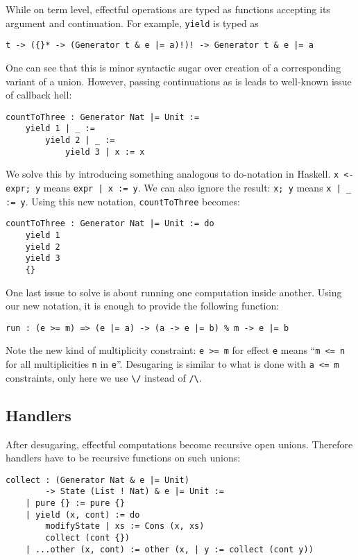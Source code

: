 \documentclass[a4paper,14pt]{extreport}
\begin{document}
While on term level, effectful operations are typed as functions accepting its
argument and continuation. For example, \verb|yield| is typed as

\begin{verbatim}
t -> ({}* -> (Generator t & e |= a)!)! -> Generator t & e |= a
\end{verbatim}

One can see that this is minor syntactic sugar over creation of a corresponding
variant of a union. However, passing continuations as is leads to well-known
issue of callback hell:

\begin{verbatim}
countToThree : Generator Nat |= Unit :=
    yield 1 | _ :=
        yield 2 | _ :=
            yield 3 | x := x
\end{verbatim}

We solve this by introducing something analogous to do-notation in Haskell.
\verb|x <- expr; y| means \verb+expr | x := y+. We can also ignore the result:
\verb|x; y| means \verb+x | _ := y+. Using this new notation,
\verb|countToThree| becomes:

\begin{verbatim}
countToThree : Generator Nat |= Unit := do
    yield 1
    yield 2
    yield 3
    {}
\end{verbatim}

One last issue to solve is about running one computation inside another. Using
our new notation, it is enough to provide the following function:

\begin{verbatim}
run : (e >= m) => (e |= a) -> (a -> e |= b) % m -> e |= b
\end{verbatim}

Note the new kind of multiplicity constraint: \verb|e >= m| for effect \verb|e|
means ``\verb|m <= n| for all multiplicities \verb|n| in \verb|e|''. Desugaring
is similar to what is done with \verb|a <= m| constraints, only here we use
\verb|\/| instead of \verb|/\|.

\subsection{Handlers}

After desugaring, effectful computations become recursive open unions. Therefore
handlers have to be recursive functions on such unions:

\begin{verbatim}
collect : (Generator Nat & e |= Unit)
        -> State (List ! Nat) & e |= Unit :=
    | pure {} := pure {}
    | yield (x, cont) := do
        modifyState | xs := Cons (x, xs)
        collect (cont {})
    | ...other (x, cont) := other (x, | y := collect (cont y))
\end{verbatim}
\end{document}
